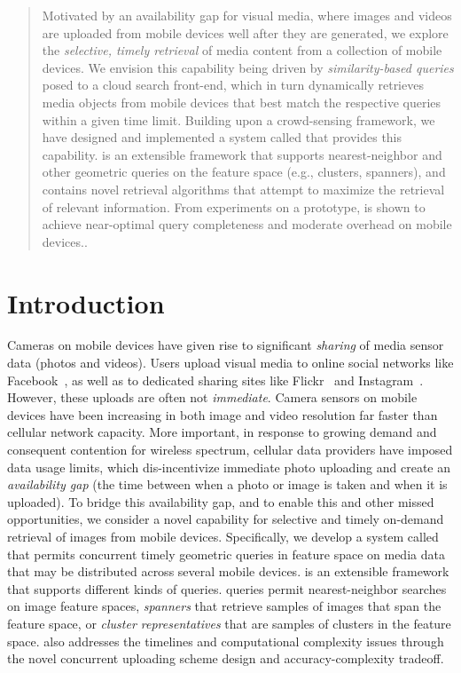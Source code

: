 \begin{abstract}

Motivated by an availability gap for visual media, where images and
videos are uploaded from mobile devices well after they are generated,
we explore the \emph{selective,
  timely retrieval} of media content from a collection of mobile
devices.
%
We envision this capability being driven by \emph{similarity-based
  queries} posed to a cloud search front-end, which in turn
dynamically retrieves media objects from mobile devices that best
match the respective queries within a given time limit.
%
Building upon a crowd-sensing framework, we have designed and
implemented a system called \mscope that provides this capability.
%
\mscope is an extensible framework that supports nearest-neighbor and
other geometric queries on the feature space (e.g., clusters,
spanners), and contains novel retrieval algorithms that attempt to
maximize the retrieval of relevant information.
%
From experiments on a prototype, \mscope is shown to achieve
near-optimal query completeness and moderate overhead on mobile
devices..

\end{abstract}

\section {Introduction}
Cameras on mobile devices have given rise to significant
\emph{sharing} of media sensor data (photos and videos).
%
Users upload visual media to online social networks like
Facebook~\cite{facebook}, as well as to dedicated sharing sites like
Flickr~\cite{Flickr} and Instagram~\cite{instagram}.
%
However, these uploads are often not \emph{immediate}.
%
Camera sensors on mobile devices have been increasing in both image
and video resolution far faster than cellular network capacity.
%
More important, in response to growing demand and consequent
contention for wireless spectrum, cellular data providers have imposed
data usage limits, which dis-incentivize immediate photo uploading and
create an \emph{availability gap} (the time between when a photo or
image is taken and when it is uploaded).
%
To bridge this availability gap, and to enable this and other missed
opportunities, we consider a novel capability for selective and timely on-demand
retrieval of images from mobile devices.
%
Specifically, we develop a system called \mscope that permits
concurrent timely geometric queries in feature space on media data
that may be distributed across several mobile devices.
%
\mscope is an extensible framework that supports different kinds of
queries.
%
\mscope queries permit nearest-neighbor searches on image feature
spaces, \emph{spanners} that retrieve samples of images that span
the feature space, or \emph{cluster representatives} that are samples
of clusters in the feature space.
%
\mscope also addresses the timelines and computational complexity issues through the novel concurrent uploading scheme design and accuracy-complexity tradeoff.


